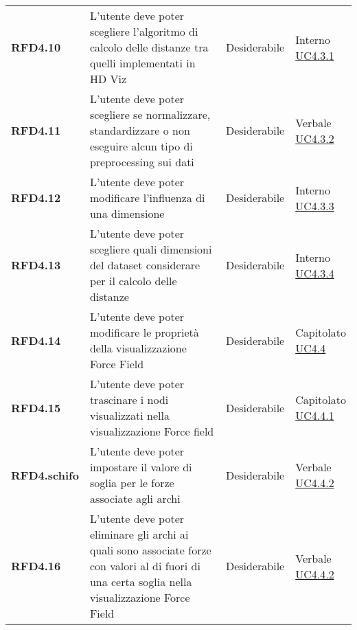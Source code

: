 \begin{longtable}[H]{>{\raggedright\bfseries}m{20mm} >{\raggedright}m{90mm} >{\raggedright}m{28mm} >{\raggedright\arraybackslash}m{30mm}}
    RFD4.10
    & L'utente deve poter scegliere l'algoritmo di calcolo delle distanze tra quelli implementati in HD Viz
    & Desiderabile
    & \makecell{ Interno \\ \hyperref[par:uc4.3.1]{UC4.3.1} }\\

    RFD4.11
    & L'utente deve poter scegliere se normalizzare, standardizzare o non eseguire alcun tipo di preprocessing sui dati
    & Desiderabile
    & \makecell{ Verbale \\ \hyperref[par:uc4.3.2]{UC4.3.2} }\\

    RFD4.12
    & L'utente deve poter modificare l'influenza di una dimensione
    & Desiderabile
    & \makecell{ Interno \\ \hyperref[par:uc4.3.3]{UC4.3.3} }\\

    RFD4.13
    & L'utente deve poter scegliere quali dimensioni del dataset considerare per il calcolo delle distanze
    & Desiderabile
    & \makecell{ Interno \\ \hyperref[par:uc4.3.2]{UC4.3.4} }\\

    RFD4.14
    & L'utente deve poter modificare le proprietà della visualizzazione Force Field
    & Desiderabile
    & \makecell{ Capitolato \\ \hyperref[ssub:uc4.4]{UC4.4} }\\

    RFD4.15
    & L'utente deve poter trascinare i nodi visualizzati nella visualizzazione Force field
    & Desiderabile
    & \makecell{ Capitolato \\ \hyperref[par:uc4.4.1]{UC4.4.1} }\\

    RFD4.schifo
    & L'utente deve poter impostare il valore di soglia per le forze associate agli archi
    & Desiderabile
    & \makecell{ Verbale \\ \hyperref[par:uc4.4.2]{UC4.4.2} }\\

    RFD4.16
    & L'utente deve poter eliminare gli archi ai quali sono associate forze con valori al di fuori di una certa soglia
    nella visualizzazione Force Field
    & Desiderabile
    & \makecell{ Verbale \\ \hyperref[par:uc4.4.2]{UC4.4.2} }\\


\end{longtable}
